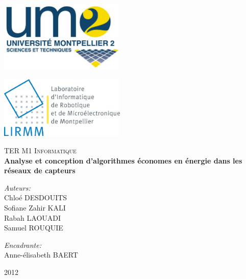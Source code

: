 \documentclass[a4paper]{report}
\theoremstyle{definition}
\begin{document}
\normalsize
{}


\begin{titlepage}

\begin{minipage}[c][4cm][t]{8cm}
\raggedright 
\includegraphics[width=6cm]{./logo_um2}
\end{minipage}
\begin{minipage}[c][4cm][t]{8cm}
\raggedleft
\includegraphics[width=6cm]{./LogoLIRMM}
\end{minipage}

\vfill

\begin{center}
\textsc{\Large TER M1 Informatique}\\[0.5cm]

\hspace{0.4cm}
{ \huge \bfseries Analyse et conception d'algorithmes \'economes en \'energie dans les r\'eseaux de capteurs}\\[3cm]

\begin{minipage}[c][4cm][t]{0.4\textwidth}
\raggedright \large
\emph{Auteurs:}\\
Chlo\'e DESDOUITS\\
Sofiane Zahir KALI\\
Rabah LAOUADI\\
Samuel ROUQUIE
\end{minipage}
\begin{minipage}[c][4cm][t]{0.4\textwidth}
\raggedleft \large
\emph{Encadrante:} \\
Anne-\'elisabeth BAERT
\end{minipage}

\vfill
{\large 2012}
\end{center}
\end{titlepage}
\end{document}
